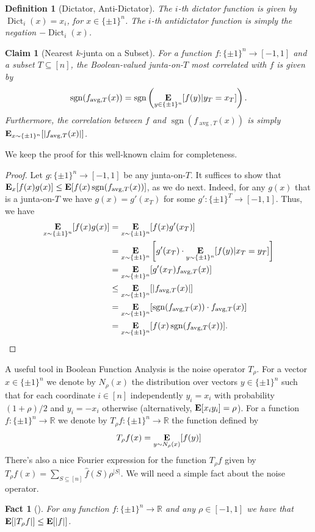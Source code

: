 \documentclass[10pt,a4paper]{article}
\theoremstyle{plain}
\newtheorem{claim}[theorem]{Claim}
\newtheorem{fact}[theorem]{Fact}
\newtheorem{definition}[theorem]{Definition}
\theoremstyle{remark}
\theoremstyle{plain}
\providecommand{\R}{}
\renewcommand{\R}{\mathbb{R}}
\providecommand{\E}{}
\renewcommand{\E}{\mathop{\bf E\/}}
\newcommand{\sgn}{\operatorname{sgn}}
\renewcommand{\hat}{\widehat}
\newcommand{\pmone}{\{\pm 1\}}
\newcommand{\Dict}{\operatorname{Dict}}
\newcommand{\avg}{\operatorname{avg}}
\newcommand{\BooleanHypercube}[1]{\{\pm 1\}^{#1}}
\begin{document}
%
%
%
\begin{definition}[Dictator, Anti-Dictator]
The $i$-th dictator function is given by $\Dict_i(x) = x_i$, for $x \in \pmone^n$. The $i$-th antidictator function is simply the negation $-\Dict_i(x)$.
\end{definition}
%
%
\begin{claim}[Nearest $k$-junta on a Subset]
\label{claim:maximum-correlation-junta}
For a function $f:\BooleanHypercube{n} \to [-1,1]$ and a subset $T \subseteq [n]$, 
the Boolean-valued junta-on-$T$ most correlated with $f$ is given by
$$
\sgn(f_{\avg, T}(x)) = \sgn\left(\E_{y \in \BooleanHypercube{n}}[f(y)|y_T = x_T]\right).
$$
Furthermore, the correlation between $f$ and $\sgn(f_{\avg, T}(x))$ is simply
$\E_{x\sim \pmone^n}[|f_{\avg,T}(x)|]$.
\end{claim}
We keep the proof for this well-known claim for completeness.
\begin{proof}
Let $g: \pmone^n \to [-1,1]$ be any junta-on-$T$.
It suffices to show that $\E_x[f(x)g(x)] \le \E[f(x) \sgn(f_{\avg, T}(x))]$, as we do next.
Indeed, for any $g(x)$ that is a junta-on-$T$ we have $g(x) = g'(x_T)$ for some $g': \pmone^T \to [-1,1]$. Thus, we have
\begin{align*}
\E_{x\sim \pmone^n}[f(x)g(x)] &=
\E_{x\sim \pmone^n}[f(x)g'(x_T)]\\
&= \E_{x \sim \pmone^n}\left[g'(x_T) \cdot \E_{y \sim \pmone^n}[f(y)|x_T=y_T]\right]\\
&= \E_{x \sim \pmone^n}[g'(x_T) f_{\avg,T}(x)]\\
&\le  \E_{x \sim \pmone^n}[|f_{\avg,T}(x)|]\\
&= \E_{x \sim \pmone^n}[\sgn(f_{\avg,T}(x)) \cdot f_{\avg,T}(x)]\\
 &= \E_{x\sim \pmone^n}[f(x)\sgn(f_{\avg,T}(x))].\qedhere
\end{align*}



%
%
%
%
%
%
%
\end{proof}

%


A useful tool in  Boolean Function Analysis is the noise operator $T_{\rho}$.
For a vector $x \in \pmone^n$ we denote by $N_{\rho}(x)$ the distribution over vectors $y\in \pmone^n$ such that for each coordinate $i\in [n]$ independently $y_i = x_i$ with probability $(1+\rho)/2$ and  $y_i = -x_i$ otherwise (alternatively, $\E[x_i y_i] = \rho$).
For a function $f: \pmone^n \to \R$ we denote by $T_{\rho}f: \pmone^n \to \R$ the function defined by
$$T_{\rho}f(x) = \E_{y\sim N_{\rho}(x)}[ f(y)]$$
There's also a nice Fourier expression for the function $T_{\rho}f$ given by $T_{\rho}f(x) = \sum_{S \subseteq [n]} \hat{f}(S) \rho^{|S|}$.
We will need a simple fact about the noise operator.
\begin{fact}[]
\label{fact:noise-op-l1-norm}
For any function $f:\pmone^n \to \R$ and any $\rho \in [-1,1]$ we have that $\E[|T_{\rho}f|] \le \E[|f|]$.
\end{fact}
%
%
%
%
%
\end{document}
